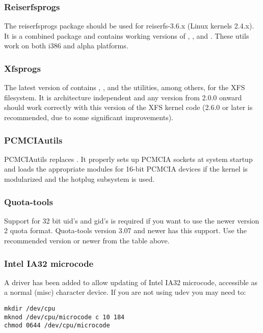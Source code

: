\documentclass[a4paper,8pt,english]{sphinxmanual}
\begin{document}
\subsubsection{Reiserfsprogs}
\label{process/changes:reiserfsprogs}
The reiserfsprogs package should be used for reiserfs-3.6.x
(Linux kernels 2.4.x). It is a combined package and contains working
versions of , ,  and
. These utils work on both i386 and alpha platforms.


\subsubsection{Xfsprogs}
\label{process/changes:xfsprogs}
The latest version of  contains , , and the
 utilities, among others, for the XFS filesystem.  It is
architecture independent and any version from 2.0.0 onward should
work correctly with this version of the XFS kernel code (2.6.0 or
later is recommended, due to some significant improvements).


\subsubsection{PCMCIAutils}
\label{process/changes:pcmciautils}
PCMCIAutils replaces . It properly sets up
PCMCIA sockets at system startup and loads the appropriate modules
for 16-bit PCMCIA devices if the kernel is modularized and the hotplug
subsystem is used.


\subsubsection{Quota-tools}
\label{process/changes:quota-tools}
Support for 32 bit uid's and gid's is required if you want to use
the newer version 2 quota format.  Quota-tools version 3.07 and
newer has this support.  Use the recommended version or newer
from the table above.


\subsubsection{Intel IA32 microcode}
\label{process/changes:intel-ia32-microcode}
A driver has been added to allow updating of Intel IA32 microcode,
accessible as a normal (misc) character device.  If you are not using
udev you may need to:

\begin{Verbatim}[commandchars=\\\{\}]
mkdir /dev/cpu
mknod /dev/cpu/microcode c 10 184
chmod 0644 /dev/cpu/microcode
\end{Verbatim}
\end{document}
